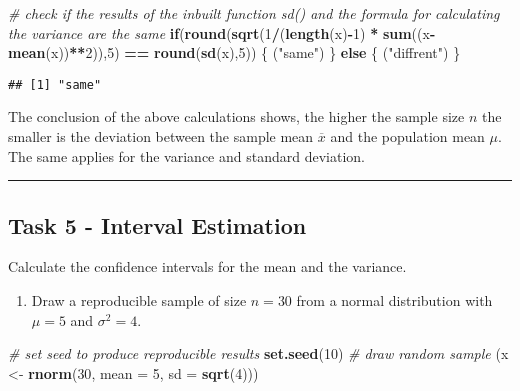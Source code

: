 \documentclass[
]{article}
\newenvironment{Shaded}{\begin{snugshade}}{\end{snugshade}}
\newcommand{\CommentTok}[1]{\textcolor[rgb]{0.56,0.35,0.01}{\textit{#1}}}
\newcommand{\ControlFlowTok}[1]{\textcolor[rgb]{0.13,0.29,0.53}{\textbf{#1}}}
\newcommand{\DataTypeTok}[1]{\textcolor[rgb]{0.13,0.29,0.53}{#1}}
\newcommand{\DecValTok}[1]{\textcolor[rgb]{0.00,0.00,0.81}{#1}}
\newcommand{\KeywordTok}[1]{\textcolor[rgb]{0.13,0.29,0.53}{\textbf{#1}}}
\newcommand{\NormalTok}[1]{#1}
\newcommand{\OperatorTok}[1]{\textcolor[rgb]{0.81,0.36,0.00}{\textbf{#1}}}
\newcommand{\StringTok}[1]{\textcolor[rgb]{0.31,0.60,0.02}{#1}}
\providecommand{\tightlist}{%
  \setlength{\itemsep}{0pt}\setlength{\parskip}{0pt}}
\begin{document}
\begin{Shaded}
\begin{Highlighting}[]
\CommentTok{# check if the results of the inbuilt function sd() and the formula for calculating the variance are the same }
\ControlFlowTok{if}\NormalTok{(}\KeywordTok{round}\NormalTok{(}\KeywordTok{sqrt}\NormalTok{(}\DecValTok{1}\OperatorTok{/}\NormalTok{(}\KeywordTok{length}\NormalTok{(x)}\OperatorTok{-}\DecValTok{1}\NormalTok{) }\OperatorTok{*}\StringTok{ }\KeywordTok{sum}\NormalTok{((x}\OperatorTok{-}\KeywordTok{mean}\NormalTok{(x))}\OperatorTok{**}\DecValTok{2}\NormalTok{)),}\DecValTok{5}\NormalTok{) }\OperatorTok{==}\StringTok{ }\KeywordTok{round}\NormalTok{(}\KeywordTok{sd}\NormalTok{(x),}\DecValTok{5}\NormalTok{)) \{}
\NormalTok{  (}\StringTok{"same"}\NormalTok{)}
\NormalTok{\} }\ControlFlowTok{else}\NormalTok{ \{}
\NormalTok{  (}\StringTok{"diffrent"}\NormalTok{)}
\NormalTok{\}}
\end{Highlighting}
\end{Shaded}

\begin{verbatim}
## [1] "same"
\end{verbatim}

The conclusion of the above calculations shows, the higher the sample
size \(n\) the smaller is the deviation between the sample mean
\(\overline{x}\) and the population mean \(\mu\). The same applies for
the variance and standard deviation.

\begin{center}\rule{0.5\linewidth}{0.5pt}\end{center}

\hypertarget{task-5---interval-estimation}{%
\subsection{Task 5 - Interval
Estimation}\label{task-5---interval-estimation}}

Calculate the confidence intervals for the mean and the variance.

\begin{enumerate}
\def\labelenumi{\arabic{enumi}.}
\tightlist
\item
  Draw a reproducible sample of size \(n = 30\) from a normal
  distribution with \(\mu=5\) and \(\sigma^{2}=4\).
\end{enumerate}

\begin{Shaded}
\begin{Highlighting}[]
\CommentTok{# set seed to produce reproducible results}
\KeywordTok{set.seed}\NormalTok{(}\DecValTok{10}\NormalTok{)}
\CommentTok{# draw random sample}
\NormalTok{(x <-}\StringTok{ }\KeywordTok{rnorm}\NormalTok{(}\DecValTok{30}\NormalTok{, }\DataTypeTok{mean =} \DecValTok{5}\NormalTok{, }\DataTypeTok{sd =} \KeywordTok{sqrt}\NormalTok{(}\DecValTok{4}\NormalTok{)))}
\end{Highlighting}
\end{Shaded}
\end{document}
